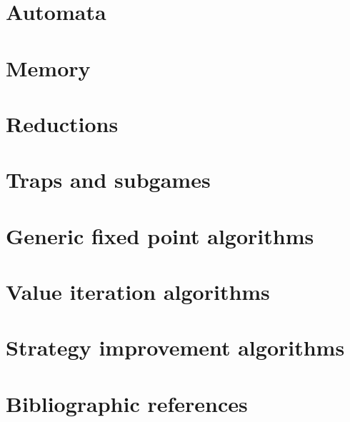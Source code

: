 
\section{Automata}
\label{1-sec:automata}



\section{Memory}
\label{1-sec:memory}



\section{Reductions}
\label{1-sec:reductions}



\section{Traps and subgames}
\label{1-sec:subgames}



\section{Generic fixed point algorithms}
\label{1-sec:fixed_points}



\section{Value iteration algorithms}
\label{1-sec:value_iteration}



\section{Strategy improvement algorithms}
\label{1-sec:strategy_improvement}



\section*{Bibliographic references}
\label{1-sec:references}


